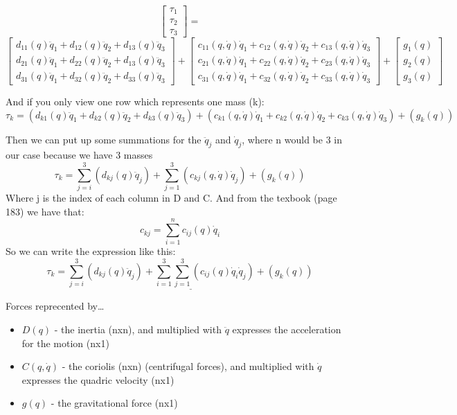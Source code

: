 \documentclass[12pt,norsk,a4paper]{article}
\begin{document}
    \[\left[\begin{array}{c} \tau_1 \\ \tau_2 \\ \tau_3 \end{array}\right] = \]
            \[\left[\begin{array}{c}
                    d_{11}(q)\ddot q_1 + d_{12}(q)\ddot q_2 + d_{13}(q)\ddot q_3\\
                    d_{21}(q)\ddot q_1 + d_{22}(q)\ddot q_2 + d_{13}(q)\ddot q_3\\
                    d_{31}(q)\ddot q_1 + d_{32}(q)\ddot q_2 + d_{33}(q)\ddot q_3
                \end{array}\right]
            +\left[\begin{array}{c}
                c_{11}(q,\dot q)\dot q_1 + c_{12}(q,\dot q)\dot q_2 + c_{13}(q,\dot q)\dot q_3\\
                c_{21}(q,\dot q)\dot q_1 + c_{22}(q,\dot q)\dot q_2 + c_{23}(q,\dot q)\dot q_3\\
                c_{31}(q,\dot q)\dot q_1 + c_{32}(q,\dot q)\dot q_2 + c_{33}(q,\dot q)\dot q_3
            \end{array}\right]
            +\left[\begin{array}{c}
                g_1(q) \\ g_2(q) \\ g_3(q)
            \end{array}\right]\]

    And if you only view one row which represents one mass (k):
    \[\tau_k = (d_{k1}(q)\ddot q_1 + d_{k2}(q)\ddot q_2 + d_{k3}(q)\ddot q_3) + (c_{k1}(q,\dot q)\dot q_1 + c_{k2}(q,\dot q)\dot q_2 + c_{k3}(q,\dot q)\dot q_3) + (g_k(q))\]

    Then we can put up some summations for the $\ddot q_j$ and $\dot q_j$, where n would be 3 in our case because we have 3 masses\\
    \[\tau_k = \sum_{j=i}^{3}(d_{kj}(q)\ddot q_j) + \sum_{j = 1}^{3}(c_{kj}(q,\dot q)\dot q_j) + (g_k(q))\]
    Where j is the index of each column in D and C. And from the texbook (page 183) we have that:
    \[c_{kj} = \sum_{i=1}^{n}c_{ij}(q)\dot q_i\]
    So we can write the expression like this:
    \[\tau_k = \underline{\sum_{j=i}^{3}(d_{kj}(q)\ddot q_j) + \sum_{i = 1}^{3}\sum_{j = 1}^{3}(c_{ij}(q)\dot q_i\dot q_j) + (g_k(q))}\]



    Forces reprecented by\dots
        \begin{itemize}
            \item $D(q)$ - the inertia (nxn), and multiplied with $\ddot q$ expresses the acceleration for the motion (nx1)
            \item $C(q,\dot q)$ - the coriolis (nxn) (centrifugal forces), and multiplied with $\dot q$ expresses the quadric velocity (nx1)
            \item $g(q)$ - the gravitational force (nx1)
        \end{itemize}
\end{document}
